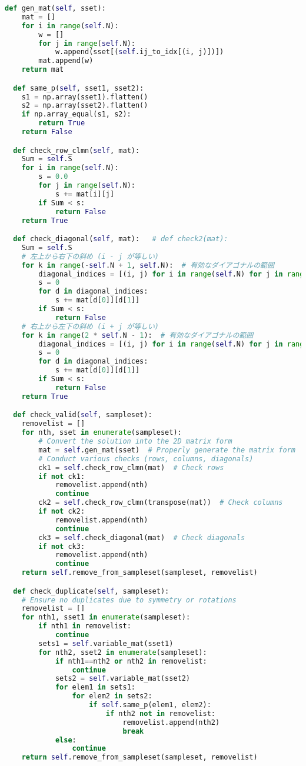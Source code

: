 \documentclass[uplatex,dvipdfmx,a4paper,11pt,oneside,openany]{jsbook}
\begin{document}
\begin{lstlisting}[language=Python]
  def gen_mat(self, sset):
    mat = []
    for i in range(self.N):
        w = []
        for j in range(self.N):
            w.append(sset[(self.ij_to_idx[(i, j)])])
        mat.append(w)
    return mat

  def same_p(self, sset1, sset2):
    s1 = np.array(sset1).flatten()
    s2 = np.array(sset2).flatten()
    if np.array_equal(s1, s2):
        return True
    return False

  def check_row_clmn(self, mat):
    Sum = self.S
    for i in range(self.N):
        s = 0.0
        for j in range(self.N):
            s += mat[i][j]
        if Sum < s:
            return False
    return True

  def check_diagonal(self, mat):   # def check2(mat):
    Sum = self.S
    # 左上から右下の斜め (i - j が等しい)
    for k in range(-self.N + 1, self.N):  # 有効なダイアゴナルの範囲
        diagonal_indices = [(i, j) for i in range(self.N) for j in range(self.N) if i - j == k]
        s = 0
        for d in diagonal_indices:
            s += mat[d[0]][d[1]]
        if Sum < s:
            return False
    # 右上から左下の斜め (i + j が等しい)
    for k in range(2 * self.N - 1):  # 有効なダイアゴナルの範囲
        diagonal_indices = [(i, j) for i in range(self.N) for j in range(self.N) if i + j == k]
        s = 0
        for d in diagonal_indices:
            s += mat[d[0]][d[1]]
        if Sum < s:
            return False
    return True

  def check_valid(self, sampleset):
    removelist = []
    for nth, sset in enumerate(sampleset):
        # Convert the solution into the 2D matrix form
        mat = self.gen_mat(sset)  # Properly generate the matrix form
        # Conduct various checks (rows, columns, diagonals)
        ck1 = self.check_row_clmn(mat)  # Check rows
        if not ck1:
            removelist.append(nth)
            continue
        ck2 = self.check_row_clmn(transpose(mat))  # Check columns
        if not ck2:
            removelist.append(nth)
            continue
        ck3 = self.check_diagonal(mat)  # Check diagonals
        if not ck3:
            removelist.append(nth)
            continue
    return self.remove_from_sampleset(sampleset, removelist)

  def check_duplicate(self, sampleset):
    # Ensure no duplicates due to symmetry or rotations
    removelist = []
    for nth1, sset1 in enumerate(sampleset):
        if nth1 in removelist:
            continue
        sets1 = self.variable_mat(sset1)
        for nth2, sset2 in enumerate(sampleset):
            if nth1==nth2 or nth2 in removelist:
                continue
            sets2 = self.variable_mat(sset2)
            for elem1 in sets1:
                for elem2 in sets2:
                    if self.same_p(elem1, elem2):
                        if nth2 not in removelist:
                            removelist.append(nth2)
                            break
            else:
                continue
    return self.remove_from_sampleset(sampleset, removelist)


\end{lstlisting}
\end{document}
